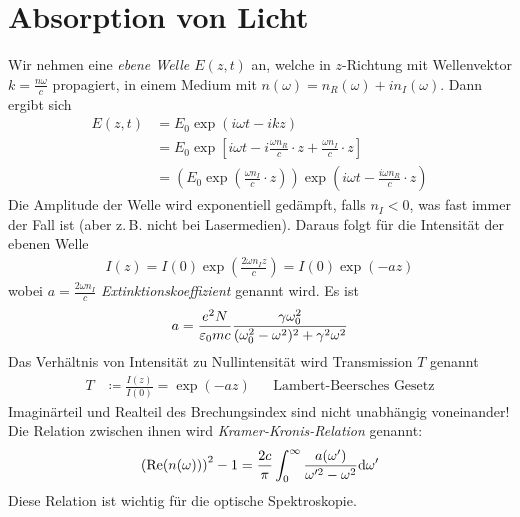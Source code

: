 \section{Absorption von Licht}
Wir nehmen eine \emph{ebene Welle $E(z,t)$} an, welche in $z$-Richtung
mit Wellenvektor $k=\frac{n\omega}{c}$ propagiert, in einem Medium mit
$n(\omega)=n_R(\omega)+in_I(\omega)$.
Dann ergibt sich
\begin{align*}
  E(z,t) &= E_0\exp(i\omega t-ikz) \\
         &= E_0\exp\left[
           i\omega t - i\frac{\omega n_R}{c}\cdot z 
           + \frac{\omega n_I}{c}\cdot z
           \right]\\
         &= \left( 
           E_0\exp\left(\frac{\omega n_I}{c}\cdot z\right)
           \right)
           \exp\left( i\omega t-\frac{i\omega n_R}{c}\cdot z\right)
\end{align*}
Die Amplitude der Welle wird exponentiell gedämpft, falls $n_I<0$, was
fast immer der Fall ist (aber z.\,B. nicht bei Lasermedien). Daraus
folgt für die Intensität der ebenen Welle
\begin{gather*}
  I(z) = I(0)\exp\left(\frac{2\omega n_I z}{c}\right)
  = I(0) \exp(-az)
\end{gather*}
wobei $a=\frac{2\omega n_I}{c}$
\emph{Extinktionskoeffizient}%
%
genannt wird. Es ist
\begin{gather*}
  a = \frac{e^2N}{\varepsilon_0 mc}        
  \frac{\gamma\omega_0^2}{(\omega_0^2-\omega^2)^2 + \gamma^2\omega^2}
\end{gather*}
Das Verhältnis von Intensität zu Nullintensität wird 
Transmission $T$%
%
%
genannt
\begin{align*}
  T &\coloneqq \frac{I(z)}{I(0)} = \exp(-az)
  &&\text{Lambert-Beersches Gesetz}
\end{align*}
 Imaginärteil und Realteil des Brechungsindex sind nicht
unabhängig voneinander! Die Relation zwischen ihnen wird
\emph{Kramer-Kronis-Relation}
genannt:
\begin{gather*}
  \left(\operatorname{Re}(n(\omega))\right)^2 - 1
  = \frac{2c}{\pi} \int_0^\infty
  \frac{a(\omega')}{\omega'^2-\omega^2}\mathrm{d} \omega'
\end{gather*}
Diese Relation ist wichtig für die optische Spektroskopie.


